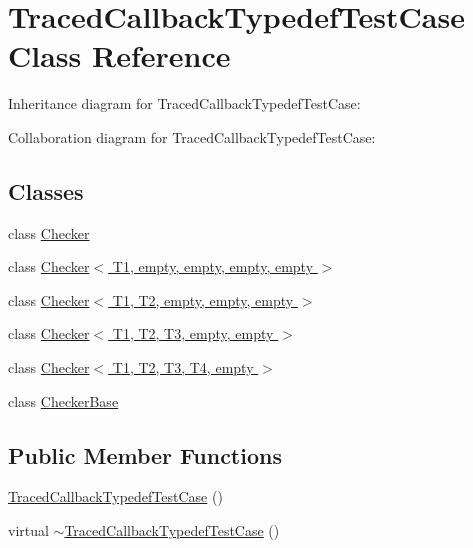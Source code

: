 \hypertarget{classTracedCallbackTypedefTestCase}{}\section{Traced\+Callback\+Typedef\+Test\+Case Class Reference}
\label{classTracedCallbackTypedefTestCase}


Inheritance diagram for Traced\+Callback\+Typedef\+Test\+Case\+:


Collaboration diagram for Traced\+Callback\+Typedef\+Test\+Case\+:
\subsection*{Classes}
\begin{DoxyCompactItemize}
\item 
class \hyperlink{classTracedCallbackTypedefTestCase_1_1Checker}{Checker}
\item 
class \hyperlink{classTracedCallbackTypedefTestCase_1_1Checker_3_01T1_00_01empty_00_01empty_00_01empty_00_01empty_01_4}{Checker$<$ T1, empty, empty, empty, empty $>$}
\item 
class \hyperlink{classTracedCallbackTypedefTestCase_1_1Checker_3_01T1_00_01T2_00_01empty_00_01empty_00_01empty_01_4}{Checker$<$ T1, T2, empty, empty, empty $>$}
\item 
class \hyperlink{classTracedCallbackTypedefTestCase_1_1Checker_3_01T1_00_01T2_00_01T3_00_01empty_00_01empty_01_4}{Checker$<$ T1, T2, T3, empty, empty $>$}
\item 
class \hyperlink{classTracedCallbackTypedefTestCase_1_1Checker_3_01T1_00_01T2_00_01T3_00_01T4_00_01empty_01_4}{Checker$<$ T1, T2, T3, T4, empty $>$}
\item 
class \hyperlink{classTracedCallbackTypedefTestCase_1_1CheckerBase}{Checker\+Base}
\end{DoxyCompactItemize}
\subsection*{Public Member Functions}
\begin{DoxyCompactItemize}
\item 
\hyperlink{classTracedCallbackTypedefTestCase_a084168eef32ec9fe3a8c49b233d28749}{Traced\+Callback\+Typedef\+Test\+Case} ()
\item 
virtual \hyperlink{classTracedCallbackTypedefTestCase_a4b13b5ae443861cdf9fe0e91ed2c5355}{$\sim$\+Traced\+Callback\+Typedef\+Test\+Case} ()
\end{DoxyCompactItemize}
